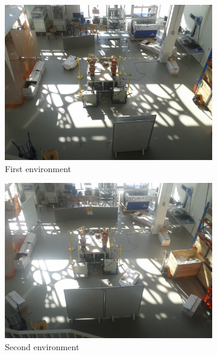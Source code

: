 \begin{figure}[htbp]
	\begin{subfigure}[t]{0.499\textwidth}	
		\centering	
		\includegraphics[width=1\textwidth]{chapters/evaluation/figures/mayhem_robolab1}
		\caption{First environment}
		\label{fig:location_environment1}
	\end{subfigure}
	\begin{subfigure}[t]{0.499\textwidth}
		\centering
		\includegraphics[width=1\textwidth]{chapters/evaluation/figures/mayhem_robolab2}
		\caption{Second environment}
		\label{fig:location_environment2}
	\end{subfigure}
	\begin{subfigure}[t]{0.499\textwidth}

\end{subfigure}
\end{figure}
